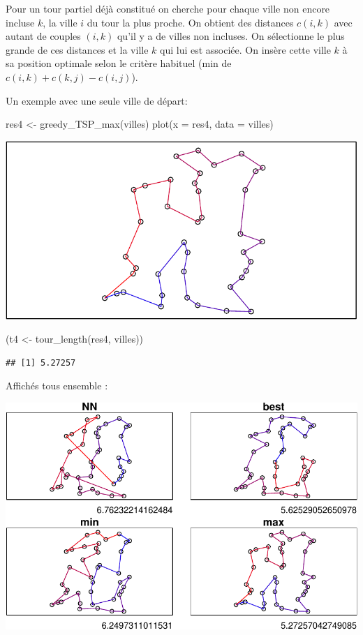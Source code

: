\documentclass[
]{article}
\newenvironment{Shaded}{\begin{snugshade}}{\end{snugshade}}
\newcommand{\AttributeTok}[1]{\textcolor[rgb]{0.77,0.63,0.00}{#1}}
\newcommand{\FunctionTok}[1]{\textcolor[rgb]{0.00,0.00,0.00}{#1}}
\newcommand{\NormalTok}[1]{#1}
\newcommand{\OtherTok}[1]{\textcolor[rgb]{0.56,0.35,0.01}{#1}}
\begin{document}
Pour un tour partiel déjà constitué on cherche pour chaque ville non
encore incluse \(k\), la ville \(i\) du tour la plus proche. On obtient
des distances \(c(i,k)\) avec autant de couples \((i,k)\) qu'il y a de
villes non incluses. On sélectionne le plus grande de ces distances et
la ville \(k\) qui lui est associée. On insère cette ville \(k\) à sa
position optimale selon le critère habituel (min de
\(c(i,k) + c(k,j) - c(i,j)\)).

Un exemple avec une seule ville de départ:

\begin{Shaded}
\begin{Highlighting}[]
\NormalTok{res4 }\OtherTok{\textless{}{-}} \FunctionTok{greedy\_TSP\_max}\NormalTok{(villes)}
\FunctionTok{plot}\NormalTok{(}\AttributeTok{x =}\NormalTok{ res4, }\AttributeTok{data =}\NormalTok{ villes)}
\end{Highlighting}
\end{Shaded}

\includegraphics{rapport_TSP_files/figure-latex/insert farthest-1.pdf}

\begin{Shaded}
\begin{Highlighting}[]
\NormalTok{(t4 }\OtherTok{\textless{}{-}} \FunctionTok{tour\_length}\NormalTok{(res4, villes))}
\end{Highlighting}
\end{Shaded}

\begin{verbatim}
## [1] 5.27257
\end{verbatim}

Affichés tous ensemble :

\includegraphics{rapport_TSP_files/figure-latex/plot all-1.pdf}
\end{document}

